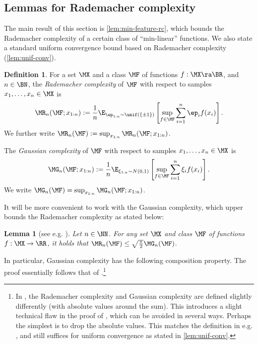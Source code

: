 \documentclass[11pt, oneside]{article}
\theoremstyle{plain}
\newtheorem{lemma}[theorem]{Lemma}
\theoremstyle{definition}
\newtheorem{definition}[theorem]{Definition}
\numberwithin{theorem}{section}
\renewcommand{\^}[1]{^{(#1)}}
\begin{document}
\subsection{Lemmas for Rademacher complexity}

The main result of this section is \cref{lem:min-feature-rc}, which bounds the Rademacher complexity of a certain class of ``min-linear'' functions. We also state a standard uniform convergence bound based on Rademacher complexity (\cref{lem:unif-conv}).

\begin{definition}
For a set $\MX$ and a class $\MF$ of functions $f : \MX \ra \BR$, and $n \in \BN$, the \emph{Rademacher complexity} of $\MF$ with respect to samples $x_1, \ldots, x_n \in \MX$ is
\begin{align}
\MR_n(\MF; x_{1:n}) := \frac{1}{n} \E_{\ep_{1:n} \sim \unif(\{ \pm 1 \})} \left[ \sup_{f \in \MF} \sum_{i=1}^n \ep_i f(x_i) \right]\nonumber.
\end{align}
We further write $\MR_n(\MF) := \sup_{x_{1:n}} \MR_n(\MF; x_{1:n})$.

The \emph{Gaussian complexity} of $\MF$ with respect to samples $x_1,\dots,x_n \in \MX$ is
\[\MG_n(\MF; x_{1:n}) := \frac{1}{n}\E_{\xi_{1:n} \sim N(0,1)}\left[\sup_{f\in\MF} \sum_{i=1}^n \xi_i f(x_i) \right].\] 
We write $\MG_n(\MF) = \sup_{x_{1:n}} \MG_n(\MF;x_{1:n})$.
\end{definition}

It will be more convenient to work with the Gaussian complexity, which upper bounds the Rademacher complexity as stated below:

\begin{lemma}[see e.g. {\cite[Exercise 5.5]{wainwright2019high}}]\label{lemma:rademacher-gaussian}
Let $n \in \NN$. For any set $\MX$ and class $\MF$ of functions $f: \MX \to \RR$, it holds that $\MR_n(\MF) \leq \sqrt{\frac{\pi}{2}} \MG_n(\MF)$.
\end{lemma}




In particular, Gaussian complexity has the following composition property. The proof essentially follows that of \cite[Theorem 14]{bartlett2002rademacher}.\footnote{In \cite{bartlett2002rademacher}, the Rademacher complexity and Gaussian complexity are defined slightly differently (with absolute values around the sum). This introduces a slight technical flaw in the proof of \cite[Theorem 14]{bartlett2002rademacher}, which can be avoided in several ways. Perhaps the simplest is to drop the absolute values. This matches the definition in e.g. \cite{shalev2014understanding}, and still suffices for uniform convergence as stated in \cref{lem:unif-conv}.}
\end{document}
